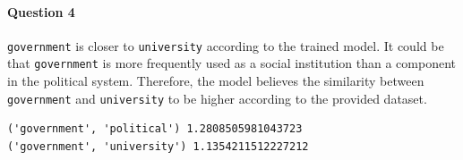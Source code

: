 \documentclass{article}
\begin{document}
    \paragraph{Question 4} \texttt{government} is closer to \texttt{university} according to the trained model. 
    It could be that \texttt{government} is more frequently used as a social institution than a component in the political system. Therefore, the model believes the similarity between \texttt{government} and \texttt{university} to be higher according to the provided dataset.
    \begin{lstlisting}
('government', 'political') 1.2808505981043723
('government', 'university') 1.1354211512227212
    \end{lstlisting}
\end{document}
